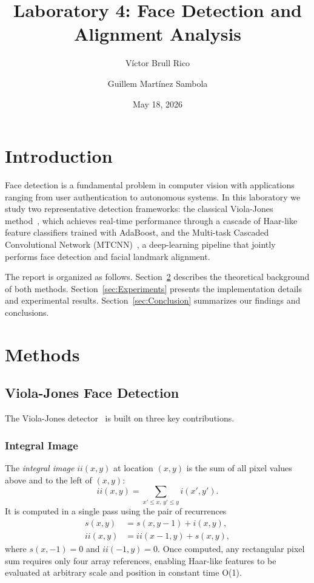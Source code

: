 \documentclass{article}
\title{Laboratory 4: Face Detection and Alignment Analysis}
\author{Víctor Brull Rico \and Guillem Martínez Sambola}
\date{May 18, 2026}
\begin{document}
\maketitle

\section{Introduction}

Face detection is a fundamental problem in computer vision with
applications ranging from user authentication to autonomous systems.
In this laboratory we study two representative detection frameworks:
the classical Viola-Jones method~\cite{viola2004robust}, which
achieves real-time performance through a cascade of Haar-like feature
classifiers trained with AdaBoost, and the Multi-task Cascaded
Convolutional Network (MTCNN)~\cite{zhang2016joint}, a deep-learning
pipeline that jointly performs face detection and facial landmark
alignment.

The report is organized as follows. Section~\ref{sec:Methods}
describes the theoretical background of both methods.
Section~\ref{sec:Experiments} presents the implementation details and
experimental results. Section~\ref{sec:Conclusion} summarizes our
findings and conclusions.

\section{Methods}
\label{sec:Methods}

\subsection{Viola-Jones Face Detection}

The Viola-Jones detector~\cite{viola2004robust} is built on three
key contributions.

\subsubsection{Integral Image}

The \emph{integral image} $ii(x,y)$ at location $(x,y)$ is the sum
of all pixel values above and to the left of $(x,y)$:
\begin{equation}
    ii(x,y) = \sum_{x'\le x,\, y'\le y} i(x',y').
\end{equation}
It is computed in a single pass using the pair of recurrences
\begin{align}
    s(x,y)  &= s(x,y-1) + i(x,y), \label{eq:row_sum}\\
    ii(x,y) &= ii(x-1,y) + s(x,y), \label{eq:int_img}
\end{align}
where $s(x,-1)=0$ and $ii(-1,y)=0$.
Once computed, any rectangular pixel sum requires only four array
references, enabling Haar-like features to be evaluated at arbitrary
scale and position in constant time O(1).
\end{document}
